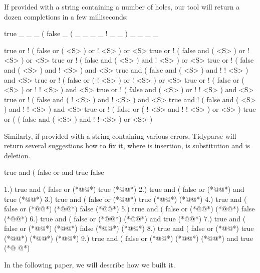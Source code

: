 \documentclass[sigplan,nonacm]{acmart}\settopmatter{printfolios=false,printccs=false,printacmref=false}
\begin{document}
\noindent If provided with a string containing a number of holes, our tool will return a dozen completions in a few milliseconds:

\begin{tidyinput}
true _ _ _ ( false _ ( _ _ _ _ ! _ _ ) _ _ _ _
\end{tidyinput}

\begin{tidyoutput}
true or ! ( false or ( <S> ) or ! <S> ) or <S>
true or ! ( false and ( <S> ) or ! <S> ) or <S>
true or ! ( false and ( <S> ) and ! <S> ) or <S>
true or ! ( false and ( <S> ) and ! <S> ) and <S>
true and ( false and ( <S> ) and ! ! <S> ) and <S>
true or ! ( false or ( ! <S> ) or ! <S> ) or <S>
true or ! ( false or ( <S> ) or ! ! <S> ) and <S>
true or ! ( false and ( <S> ) or ! ! <S> ) and <S>
true or ! ( false and ( ! <S> ) and ! <S> ) and <S>
true and ! ( false and ( <S> ) and ! ! <S> ) and <S>
true or ! ( false or ( ! <S> and ! ! <S> ) or <S> )
true or ( ( false and ( <S> ) and ! ! <S> ) or <S> )
\end{tidyoutput}

\noindent Similarly, if provided with a string containing various errors, Tidyparse will return several suggestions how to fix it, where  is insertion,  is substitution and  is deletion.

\begin{tidyinput}
true and ( false or and true false
\end{tidyinput}

\begin{tidyoutput}
1.) true and ( false or (*@\hlorange{!}@*) true (*@\hlorange{)}@*)
2.) true and ( false or (*@@*) and true (*@\hlorange{)}@*)
3.) true and ( false or (*@\hlorange{(}@*) true (*@\hlorange{)}@*) (*@\hlgreen{)}@*)
4.) true and ( false or (*@\hlorange{!}@*) (*@\hlorange{!}@*) false (*@\hlgreen{)}@*)
5.) true and ( false or (*@@*) (*@@*) false (*@\hlgreen{)}@*)
6.) true and ( false or (*@\hlgreen{!}@*) (*@@*) and true (*@\hlorange{)}@*)
7.) true and ( false or (*@\hlorange{!}@*) (*@\hlorange{(}@*) false (*@\hlgreen{)}@*) (*@\hlgreen{)}@*)
8.) true and ( false or (*@\hlorange{!}@*) true (*@\hlorange{)}@*) (*@@*) (*@@*)
9.) true and ( false or (*@\hlgreen{!}@*) (*@@*) (*@\hlgreen{)}@*) and true (*@ @*)
\end{tidyoutput}

\noindent In the following paper, we will describe how we built it.
\end{document}
